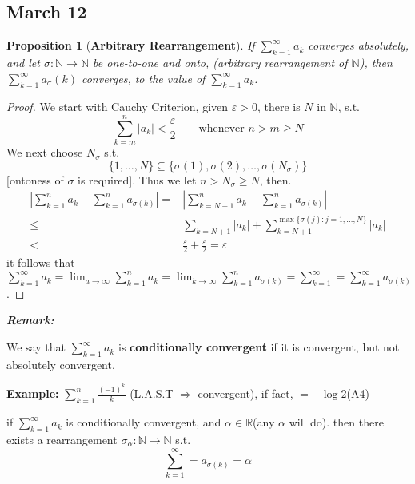 \documentclass[12pt]{article}
\theoremstyle{plain}
\newtheorem{proposition}{Proposition}[subsection]
\newcommand{\abs}[1]{\left| #1 \right|}
\newcommand{\mN}{{\mathbb{N}}}
\newcommand{\mR}{{\mathbb{R}}}
\newcommand{\ep}{\varepsilon}
\begin{document}
\subsection{March 12}
\begin{proposition}[\textbf{Arbitrary Rearrangement}]
	If $\sum_{k=1}^{\infty} a_k$ converges absolutely, and let $\sigma :\mN
	\to \mN$ be one-to-one and onto, (arbitrary rearrangement of $\mN$), then
	$\sum_{k=1}^{\infty} a_{\sigma}(k)$ converges, to the value of 
	$\sum_{k=1}^{\infty} a_k$. 
\end{proposition}
\begin{proof}
	We start with Cauchy Criterion, given $\ep > 0$, there is $N$ in $\mN$, 
	s.t. 
	\[
		\sum_{k=m}^n \abs{a_k} < \frac{\ep}2 \qquad 
		\text{whenever } n > m \geq N
	\]
	We next choose $N_{\sigma}$ s.t. 
	\[
		\{1, \ldots, N\} \subseteq 
		\{\sigma(1), \sigma (2), \ldots, \sigma(N_{\sigma})\}
	\]
	[ontoness of $\sigma$ is required]. Thus we let $n > N_{\sigma} \geq N$,
	then. 
	\begin{align*}
		\abs{\sum_{k=1}^n a_k - \sum_{k=1}^n a_{\sigma(k)}}
		=& \abs{\sum_{k=N+1}^n a_k - \sum_{k=1}^n a_{\sigma(k)}}	\\
		\leq& \sum_{k=N+1} \abs{a_k} +
		\sum_{k = N+1}^{\max\{\sigma(j) : j=1,\ldots, N\}} \abs{a_k}	\\
		<& \frac{\ep}2 + \frac{\ep}2 = \ep
	\end{align*}
	it follows that 
	$\sum_{k=1}^{\infty} a_k = \lim_{a\to\infty} \sum_{k=1}^n a_k 
	= \lim_{k\to\infty} \sum_{k=1}^n a_{\sigma(k)} = \sum_{k=1}^{\infty}
	= \sum_{k=1}^{\infty} a_{\sigma(k)}$. 

\end{proof}


\textbf{\textit{Remark:}} 

We say that $\sum_{k=1}^{\infty} a_k$ is 
\textbf{conditionally convergent} if it is convergent, but not absolutely
convergent. 

{\color{Brown}
	\textbf{Example:}
	$\sum_{k=1}^n \frac{(-1)^k}k$ (L.A.S.T $\Rightarrow$ convergent), if fact,
	$= -\log 2$(A4)
}

if $\sum_{k=1}^{\infty}a_k$ is conditionally convergent, and $\alpha\in\mR$(any
$\alpha$ will do). then there exists a rearrangement $\sigma_{\alpha}:\mN\to
\mN$ s.t. 
\[
	\sum_{k=1}^{\infty} = a_{\sigma(k)} = \alpha
\]
\end{document}
